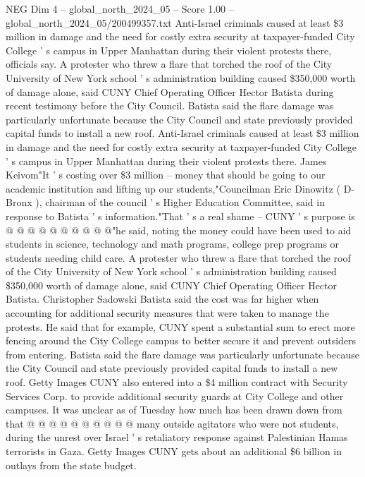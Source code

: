 \begin{textsample}{NEG Dim 4 – global\_north\_2024\_05 – Score 1.00 – global\_north\_2024\_05/200499357.txt}  \label{ex:f4_neg_114}
Anti-Israel criminals caused at least \$3 million in damage and the need for costly extra security at taxpayer-funded City College ' s campus in Upper Manhattan during their violent protests there, officials say.
A protester who threw a flare that torched the roof of the City University of New York school ' s administration building caused \$350,000 worth of damage alone, said CUNY Chief Operating Officer Hector Batista during recent testimony before the City Council.
Batista said the flare damage was particularly unfortunate because the City Council and state previously provided capital funds to install a new roof.
Anti-Israel criminals caused at least \$3 million in damage and the need for costly extra security at taxpayer-funded City College ' s campus in Upper Manhattan during their violent protests there.
James Keivom"It ' s costing over \$3 million -- money that should be going to our academic institution and lifting up our students,"Councilman Eric Dinowitz ( D-Bronx ), chairman of the council ' s Higher Education Committee, said in response to Batista ' s information."That ' s a real shame -- CUNY ' s purpose is @ @ @ @ @ @ @ @ @ @"he said, noting the money could have been used to aid students in science, technology and math programs, college prep programs or students needing child care.
A protester who threw a flare that torched the roof of the City University of New York school ' s administration building caused \$350,000 worth of damage alone, said CUNY Chief Operating Officer Hector Batista.
Christopher Sadowski Batista said the cost was far higher when accounting for additional security measures that were taken to manage the protests.
He said that for example, CUNY spent a substantial sum to erect more fencing around the City College campus to better secure it and prevent outsiders from entering.
Batista said the flare damage was particularly unfortunate because the City Council and state previously provided capital funds to install a new roof.
Getty Images CUNY also entered into a \$4 million contract with Security Services Corp. to provide additional security guards at City College and other campuses.
It was unclear as of Tuesday how much has been drawn down from that @ @ @ @ @ @ @ @ @ @ many outside agitators who were not students, during the unrest over Israel ' s retaliatory response against Palestinian Hamas terrorists in Gaza.
Getty Images CUNY gets about an additional \$6 billion in outlays from the state budget.

\end{textsample}
